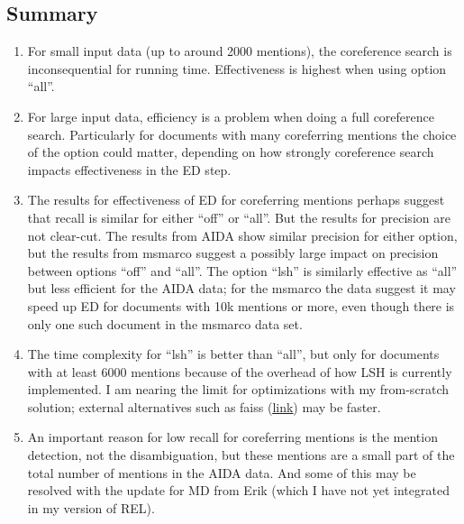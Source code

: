 \documentclass[a4paper,11pt]{article}
\numberwithin{equation}{section} %
\begin{document}
\subsection{Summary}
\begin{enumerate}
 \item For small input data (up to around 2000 mentions), the coreference search is inconsequential for running time. Effectiveness is highest when using option ``all''.
 \item For large input data, efficiency is a problem when doing a full coreference search. Particularly for documents with many coreferring mentions the choice of the option could matter, depending on how strongly coreference search impacts effectiveness in the ED step. 
 \item The results for effectiveness of ED for coreferring mentions perhaps suggest that recall is similar for either ``off'' or ``all''. But the results for precision are not clear-cut. The results from AIDA show similar precision for either option, but the results from msmarco suggest a possibly large impact on precision between options ``off'' and ``all''. The option ``lsh'' is similarly effective as ``all'' but less efficient for the AIDA data; for the msmarco the data suggest it may speed up ED for documents with 10k mentions or more, even though there is only one such document in the msmarco data set. 
 \item The time complexity for ``lsh'' is better than ``all'', but only for documents with at least 6000 mentions because of the overhead of how LSH is currently implemented. I am nearing the limit for optimizations with my from-scratch solution; external alternatives such as faiss (\href{https://github.com/facebookresearch/faiss}{\underline{link}}) may be faster. 
 \item An important reason for low recall for coreferring mentions is the mention detection, not the disambiguation, but these mentions are a small part of the total number of mentions in the AIDA data. And some of this may be resolved with the update for MD from Erik (which I have not yet integrated in my version of REL).
\end{enumerate}
\end{document}
